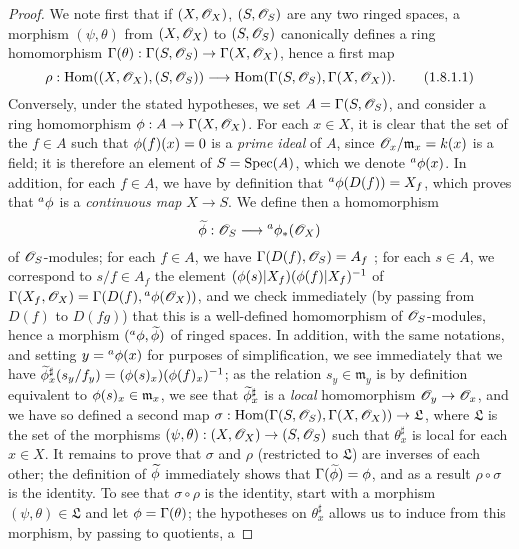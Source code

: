 \begin{proof}
\label{proof-1.1.8.1}
We note first that if $(X,\mathscr{O}_X)$, $(S,\mathscr{O}_S)$ are any two ringed spaces, a morphism
$(\psi,\theta)$ from $(X,\mathscr{O}_X)$ to $(S,\mathscr{O}_S)$ canonically defines a ring homomorphism
$\Gamma(\theta):\Gamma(S,\mathscr{O}_S)\to\Gamma(X,\mathscr{O}_X)$, hence a first map
\[
  \rho:{\mathop{\mathrm{Hom}}\nolimits}((X,\mathscr{O}_X),(S,\mathscr{O}_S))\longrightarrow{\mathop{\mathrm{Hom}}\nolimits}(\Gamma(S,\mathscr{O}_S),\Gamma(X,\mathscr{O}_X)).
  \tag{1.8.1.1}
\]
Conversely, under the stated hypotheses, we set $A=\Gamma(S,\mathscr{O}_S)$, and consider a ring
homomorphism $\phi:A\to\Gamma(X,\mathscr{O}_X)$. For each $x\in X$, it is clear that the set of the
$f\in A$ such that $\phi(f)(x)=0$ is a {\em prime ideal} of $A$, since
$\mathscr{O}_x/\mathfrak{m}_x=k(x)$ is a field; it is therefore an element of $S={\mathop{\mathrm{Spec}}\nolimits}(A)$, which
we denote ${}^a\phi(x)$. In addition, for each $f\in A$, we have by definition
 that ${}^a\phi(D(f))=X_f$, which proves that ${}^a\phi$ is a
{\em continuous map} $X\to S$. We define then a homomorphism
\[
  \widetilde{\phi}:\mathscr{O}_S\longrightarrow{}^a\phi_*(\mathscr{O}_X)
\]
of $\mathscr{O}_S$-modules; for each $f\in A$, we have $\Gamma(D(f),\mathscr{O}_S)=A_f$ ;
for each $s\in A$, we correspond to $s/f\in A_f$ the element
$(\phi(s)|X_f)(\phi(f)|X_f)^{-1}$ of $\Gamma(X_f,\mathscr{O}_X)=\Gamma(D(f),{}^a\phi(\mathscr{O}_X))$, and
we check immediately (by passing from $D(f)$ to $D(fg)$) that this is a well-defined
homomorphism of $\mathscr{O}_S$-modules, hence a morphism $({}^a\phi,\widetilde{\phi})$ of ringed
spaces. In addition, with the same notations, and setting $y={}^a\phi(x)$ for purposes of
simplification, we see immediately  that we have
$\widetilde{\phi}_x^\sharp(s_y/f_y)=(\phi(s)_x)(\phi(f)_x)^{-1}$; as the relation
$s_y\in\mathfrak{m}_y$ is by definition equivalent to $\phi(s)_x\in\mathfrak{m}_x$, we see
that $\widetilde{\phi}_x^\sharp$ is a {\em local} homomorphism $\mathscr{O}_y\to\mathscr{O}_x$, and we have
so defined a second map $\sigma:{\mathop{\mathrm{Hom}}\nolimits}(\Gamma(S,\mathscr{O}_S),\Gamma(X,\mathscr{O}_X))\to\mathfrak{L}$, where
$\mathfrak{L}$ is the set of the morphisms $(\psi,\theta):(X,\mathscr{O}_X)\to(S,\mathscr{O}_S)$ such that
$\theta_x^\sharp$ is local for each $x\in X$. It remains to prove that $\sigma$ and $\rho$
(restricted to $\mathfrak{L}$) are inverses of each other; the definition of
$\widetilde{\phi}$ immediately shows that $\Gamma(\widetilde{\phi})=\phi$, and as a result
$\rho\circ\sigma$ is the identity. To see that $\sigma\circ\rho$ is the identity, start with a
morphism $(\psi,\theta)\in\mathfrak{L}$ and let $\phi=\Gamma(\theta)$; the hypotheses on
$\theta_x^\sharp$ allows us to induce from this morphism, by passing to quotients, a

\end{proof}
